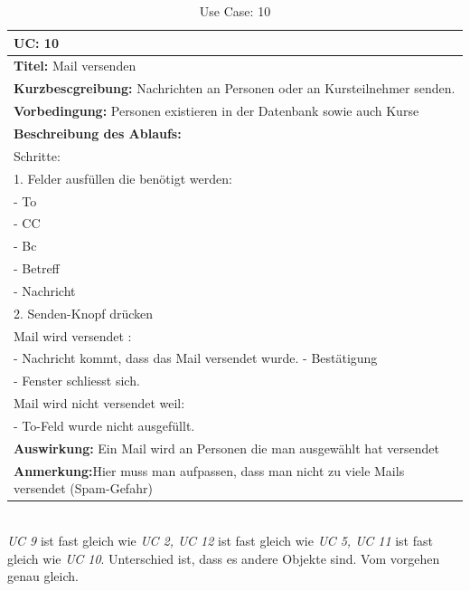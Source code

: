 \begin{table}[t]
\caption{Use Case: 10}
\begin{tabular}[ht]{|p{15cm}|}
  \hline
  \textbf{UC:} 10\\
  \hline
  \textbf{Titel:} Mail versenden\\
  \hline
  \textbf{Kurzbescgreibung:} Nachrichten an Personen oder an Kursteilnehmer senden.\\
  \hline
  \textbf{Vorbedingung:} Personen existieren in der Datenbank sowie auch Kurse\\
  \hline
  \textbf{Beschreibung des Ablaufs:}\\
Schritte:\\
1. Felder ausfüllen die benötigt werden:\\
- To\\
- CC\\
- Bc\\
- Betreff\\
- Nachricht\\
2. Senden-Knopf drücken\\
Mail wird versendet :\\
- Nachricht kommt, dass das Mail versendet wurde. - Bestätigung\\
- Fenster schliesst sich.\\
Mail wird nicht versendet weil:\\
- To-Feld wurde nicht ausgefüllt.\\
  \hline
  \textbf{Auswirkung:} Ein Mail wird an Personen die man ausgewählt hat versendet\\
  \hline
  \textbf{Anmerkung:}Hier muss man aufpassen, dass man nicht zu viele Mails versendet
(Spam-Gefahr)\\
  \hline
\end{tabular}
\end{table}
%
\\
\textit{UC 9} ist fast gleich wie \textit{UC 2, UC 12} ist fast gleich wie\textit{ UC 5, UC 11} ist fast gleich wie
\textit{UC 10}. Unterschied ist, dass es andere Objekte sind. Vom vorgehen genau gleich.
%
\clearpage
